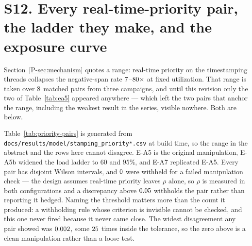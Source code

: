 \documentclass[10pt,journal,onecolumn]{IEEEtran}
\newcommand{\mainModeA}{\ref{P-sec:mechanism}}             %
\begin{document}
\begin{table}[htbp]
\caption[Grid membership against a continuum null]{\textbf{Grid membership against a continuum null.} $D$ is the mean normalized
distance to the nearest grid vertex; under the null its expectation is the value in the
\textnormal{\textit{null}} column. That column was, until this revision, the distance of
$\theta$ from its nearest vertex with no replicate noise --- the distance of the
expectation rather than the expectation of the distance, which are not the same number and
differed by up to $0.04$ here. It is now the mean of the simulated null itself, so the
sentence above it is true. $p_{\mathrm{Holm}}$ is a Monte Carlo $p$-value
($\gridDraws$ draws) after Holm correction within the family of all $\gridArms$ configurations; the
corrected value is what decides the verdict. Arms marked
\textnormal{\textit{flat (coincident)}} are those the model predicts
flat, where the two hypotheses make the same prediction and the test has no power. The
\spreadMissRates{}~msg/s rows are the \spreadMissWord{} that the spread rule of
Table~\ref{tab:quantization} misses; this test resolves both, which is why it replaced that
rule.}
\label{tab:gridinference}
\footnotesize
\centering
\setlength{\tabcolsep}{4pt}

\end{table}



\section{S12. Every real-time-priority pair, the ladder they make, and the exposure curve}
\label{sec:priority-pairs}

Section~\mainModeA{} quotes a range: real-time priority on the timestamping threads collapses the
negative-span rate $7$--$80\times$ at fixed utilization. That range is
taken over $8$ matched pairs from three campaigns, and until this revision only the two
of Table~\ref{tab:ea5} appeared anywhere --- which left the two pairs that anchor the range,
including the weakest result in the series, visible nowhere. Both are below.

Table~\ref{tab:priority-pairs} is generated from
\texttt{docs/results/model/stamping\_priority*.csv} at build time, so the range in the
abstract and the rows here cannot disagree. E-A5 is the original manipulation, E-A5b widened
the load ladder to $60$ and $95\%$, and E-A7 replicated E-A5. Every pair has disjoint Wilson
intervals, and $0$ were withheld for a failed manipulation check --- the design
assumes real-time priority leaves $\rho$ alone, so $\rho$ is measured in both configurations and a
discrepancy above $0.05$ withholds the pair rather than reporting it hedged. Naming the
threshold matters more than the count it produced: a withholding rule whose criterion is
invisible cannot be checked, and this one never fired because it never came close. The widest
disagreement any pair showed was $0.002$, some $25$ times inside the
tolerance, so the zero above is a clean manipulation rather than a loose test.
\end{document}
